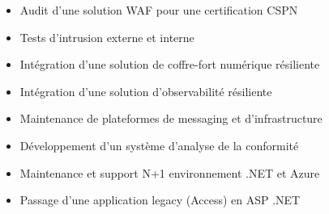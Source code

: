 \documentclass[10pt,a4paper,ragged2e,withhyper]{altacv}
\begin{document}
\begin{paracol}{2}

\begin{itemize}
\item Audit d'une solution WAF pour une certification CSPN
\item Tests d'intrusion externe et interne
\end{itemize}

\divider

\begin{itemize}
\item Intégration d'une solution de coffre-fort numérique résiliente
\item Intégration d'une solution d'observabilité résiliente
\item Maintenance de plateformes de messaging et d'infrastructure
\end{itemize}

\divider

\begin{itemize}
  \item Développement d'un système d'analyse de la conformité
  \item Maintenance et support N+1 environnement .NET et Azure
\end{itemize}

\divider

\begin{itemize}
  \item Passage d'une application legacy (Access) en ASP .NET
\end{itemize}



\end{paracol}
\end{document}

